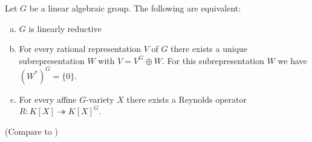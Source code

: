
\begin{theorem}\label{equiv}
  Let $G$ be a linear algebraic group.
  The following are equivalent:
  \begin{enumerate}[(a)]
  \item $G$ is linearly reductive
  \item For every rational representation $V$ of $G$ there exists a unique subrepresentation $W$ with $V = V^G \oplus W$.
    For this subrepresentation $W$ we have $(W^\ast)^G = \{0\}$.
  \item For every affine $G$-variety $X$ there exists a Reynolds operator $R \colon K[X] \twoheadrightarrow K[X]^G $.
  \end{enumerate}
  (Compare to \cite[2.2.5]{DK15})
\end{theorem}

